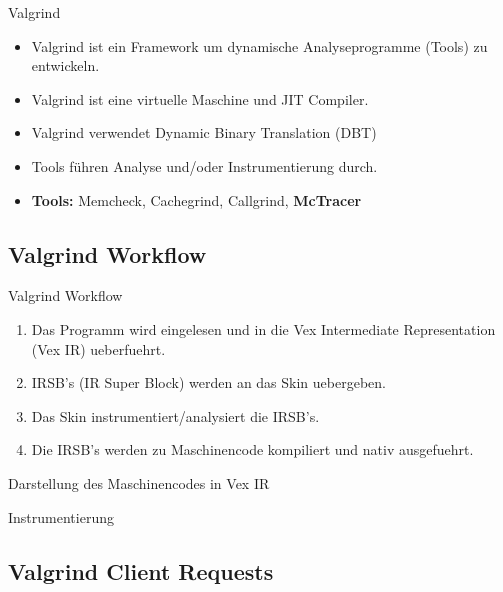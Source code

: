 \begin{frame}{Valgrind}
	\begin{itemize}
		\item Valgrind ist ein Framework um dynamische Analyseprogramme (Tools) zu entwickeln.
		\pause \item Valgrind ist eine virtuelle Maschine und JIT Compiler.
		\pause \item Valgrind verwendet Dynamic Binary Translation (DBT) 
		\pause \item Tools führen Analyse und/oder Instrumentierung durch.
		\pause \item{\bf Tools:} Memcheck, Cachegrind, Callgrind, {\bf McTracer} 
	\end{itemize}
\end{frame}

\subsection{Valgrind Workflow}

\begin{frame}{Valgrind Workflow}
	\begin{enumerate}
		\item Das Programm wird eingelesen und in die Vex Intermediate Representation (Vex IR) ueberfuehrt.
		\pause \item IRSB's (IR Super Block) werden an das Skin uebergeben. 
		\pause \item Das Skin instrumentiert/analysiert die IRSB's.
		\pause \item Die IRSB's werden zu Maschinencode kompiliert und nativ ausgefuehrt. 
	\end{enumerate}
\end{frame}

\begin{frame}{Darstellung des Maschinencodes in Vex IR}
	\lstset{frame=single}
	
\end{frame}

\begin{frame}{Instrumentierung}
	\lstset{frame=single}
		
\end{frame}

\subsection{Valgrind Client Requests}

